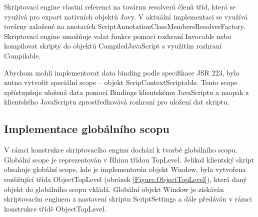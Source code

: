 Skriptovací engine vlastní referenci na továrnu resolverů členů tříd, která se využívá pro export nativních objektů Javy. V aktuální implementaci se využívá továrny založené na anotacích ScriptAnnotationClassMembersResolverFactory. Skriptovací engine umožňuje volat funkce pomocí rozhraní Invocable nebo kompilovat skripty do objektů CompiledJavaScript s využitím rozhraní Compilable.

Abychom mohli implementovat data binding podle specifikace JSR 223, bylo nutno vytvořit speciální scope -- objekt ScripContextScriptable. Tento scope zpřístupňuje uložená data pomocí Bindings klientskému JavaScriptu a naopak z klientského JavaScriptu zprostředkovává rozhraní pro uložení dat skriptu.

\subsection{Implementace globálního scopu}
\label{Chapter.Implementation.GlobalScopeImplementation}

V rámci konstrukce skriptovacího enginu dochází k tvorbě globálního scopu. Globální scope je reprezentován v Rhinu třídou TopLevel. Jelikož klientský skript obsahuje globální scope, kde je implementován objekt Window, byla vytvořena rozšiřující třída ObjectTopLevel (obrázek \ref{Figure.ObjectTopLevel}), která daný objekt do globálního scopu vkládá. Globální objekt Window je získáván skriptovacím enginem z nastavení skriptu ScriptSettings a dále předáván v rámci konstrukce třídě ObjectTopLevel.

